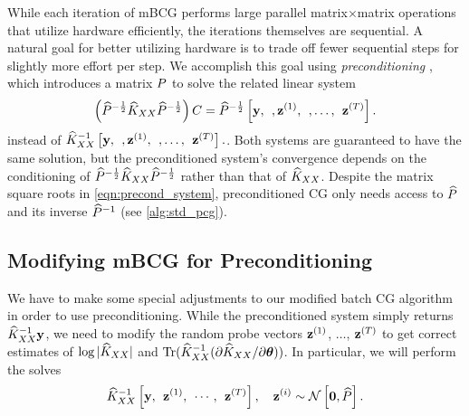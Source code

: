 \label{sec:preconditioning}

While each iteration of mBCG performs large parallel matrix$\times$matrix operations that utilize hardware efficiently, the iterations themselves are sequential.
A natural goal for better utilizing hardware is to trade off fewer sequential steps for slightly more effort per step.
We accomplish this goal using \emph{preconditioning} \citep[e.g.][]{demmel1997applied,saad2003iterative,van2003iterative,golub2012matrix}, which introduces a matrix $P$ to solve the related linear system
\begin{equation}
  \left( \widehat{P}^{- \frac 1 2} \widehat{K}_{XX} \widehat{P}^{- \frac 1 2}\right) C = \widehat{P}^{- \frac 1 2} \left[ \mathbf{y}, \:\:, \mathbf{z}^{(1)}, \:\:, \ldots, \:\: \mathbf{z}^{(T)} \right].
  \label{eqn:precond_system}
\end{equation}
instead of $\widehat{K}_{XX}^{-1} \left[  \mathbf{y}, \:\:, \mathbf{z}^{(1)}, \:\:, \ldots, \:\: \mathbf{z}^{(T)} \right].$.
Both systems are guaranteed to have the same solution, but the preconditioned system's convergence depends on the conditioning of $\widehat{P}^{- \frac 1 2} \widehat{K}_{XX} \widehat{P}^{- \frac 1 2}$ rather than that of $\widehat{K}_{XX}$.
Despite the matrix square roots in \cref{eqn:precond_system}, preconditioned CG only needs access to $\widehat{P}$ and its inverse $\widehat{P}^{-1}$ (see \cref{alg:std_pcg}).



\subsection{Modifying mBCG for Preconditioning}
\label{sec:precond_requirements}
We have to make some special adjustments to our modified batch CG algorithm in order to use preconditioning.
While the preconditioned system simply returns $\widehat{K}_{XX}^{-1} \mathbf{y}$, we need to modify the random probe vectors $\mathbf{z}^{(1)}$, $\ldots$, $\mathbf{z}^{(T)}$ to get correct estimates of $\log \vert \widehat{K}_{XX} \vert$ and $\tr{ \trainK^{-1} ( \partial \trainK / \partial \btheta) }$.
In particular, we will perform the solves
%
\begin{equation}
  \label{eqn:mod_cg_call_precond}
  \trainK^{-1} \left[ \by, \:\: \bz^{(1)}, \:\: \cdots, \:\: \bz^{(T)} \right], \quad \bz^{(i)} \sim \normaldist{\bzero}{\trainP}.
\end{equation}

